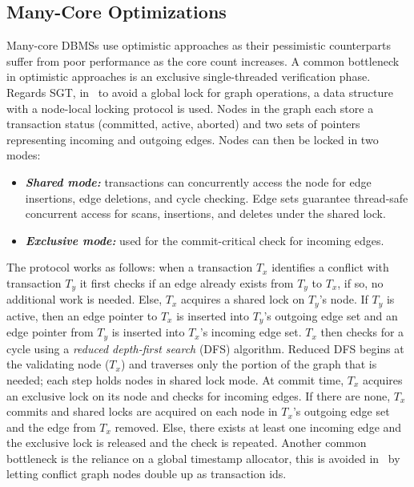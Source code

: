 \subsection{Many-Core Optimizations}
\label{sec:sgt-many-core-opt}

Many-core DBMSs use optimistic approaches as their pessimistic counterparts suffer from poor performance as the core count 
increases. A common bottleneck in optimistic approaches is an exclusive single-threaded verification phase. Regards SGT, 
in~\cite{DBLP:conf/icde/Durner019} to avoid a global lock for graph operations, a data structure with a node-local locking 
protocol is used. Nodes in the graph each store a transaction status (committed, active, aborted) and two sets of pointers representing 
incoming and outgoing edges. Nodes can then be locked in two 
modes:
\begin{itemize}
    \item \textbf{\emph{Shared mode:}} transactions can concurrently access the node for edge insertions, edge 
    deletions, and cycle checking. Edge sets guarantee thread-safe concurrent access for scans, insertions, and 
    deletes under the shared lock. 
    \item \textbf{\emph{Exclusive mode:}} used for the  commit-critical check for incoming edges. 
\end{itemize}

The protocol works as follows: when a transaction $T_x$ identifies a conflict with transaction $T_y$ it first
checks if an edge already exists from $T_y$ to $T_x$, if so, no additional work is needed. 
Else, $T_x$ acquires a shared lock on $T_y$'s node. If $T_y$ is active, then an edge pointer to $T_x$ is 
inserted into $T_y$'s outgoing edge set and an edge pointer from $T_y$ is inserted into $T_x$'s incoming edge 
set.
$T_x$ then checks for a cycle using a \emph{reduced depth-first search} (DFS)
algorithm. Reduced DFS begins at the validating node ($T_x$) and traverses only the portion of the graph that is needed; 
each step holds nodes in shared lock mode.
At commit time, $T_x$ acquires an exclusive lock on its node and checks for incoming edges. If there are none, 
$T_x$ commits and shared locks are acquired on each node in $T_x$'s outgoing edge set and the 
edge from $T_x$ removed. Else, there exists at least one incoming edge and the exclusive lock is released and the check is 
repeated. 
Another common bottleneck is the reliance on a global timestamp 
allocator, this is avoided in~\cite{DBLP:conf/icde/Durner019} by letting conflict graph nodes double up as transaction ids.

